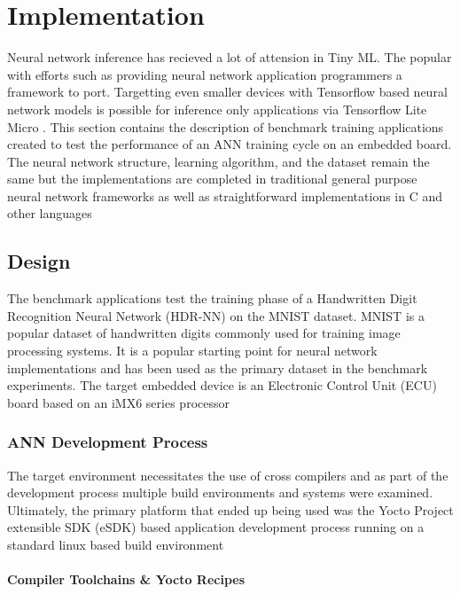 \part{Implementation}

Neural network inference has recieved a lot of attension in Tiny ML. The popular  with efforts such as  providing neural network application programmers a framework to port. Targetting even smaller devices with Tensorflow based neural network models is possible for inference only applications via Tensorflow Lite Micro \cite{tflm}. This section contains the description of benchmark training applications created to test the performance of an ANN training cycle on an embedded board. The neural network structure, learning algorithm, and the dataset remain the same but the implementations are completed in traditional general purpose neural network frameworks as well as straightforward implementations in C and other languages

\chapter{Design}

The benchmark applications test the training phase of a Handwritten Digit Recognition Neural Network (HDR-NN) on the MNIST \cite{mnist} dataset. MNIST is a popular dataset of handwritten digits commonly used for training image processing systems. It is a popular starting point for neural network implementations and has been used as the primary dataset in the benchmark experiments. The target embedded device is an Electronic Control Unit (ECU) board based on an iMX6 series processor

\section[Artificial Neural Network Development Process]{ANN Development Process}

The target environment necessitates the use of cross compilers and as part of the development process multiple build environments and systems were examined. Ultimately, the primary platform that ended up being used was the Yocto Project extensible SDK (eSDK) based application development process running on a standard linux based build environment

\subsection[Cross compilers \& Build System]{Compiler Toolchains \& Yocto Recipes}

